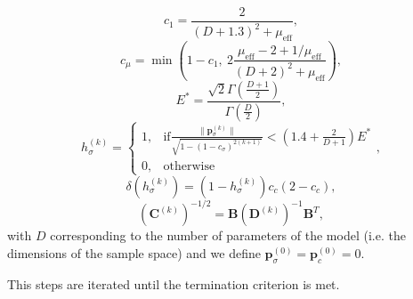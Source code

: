 \begin{equation}
c_1=\frac{2}{(D+1.3)^2+\mu_{\mathrm{eff}}},
\end{equation}
\begin{equation}
c_\mu=\min\left(1-c_1,\ 2\frac{\mu_{\mathrm{eff}}-2+1/\mu_{\mathrm{eff}}}{(D+2)^2+\mu_{\mathrm{eff}}}\right),
\end{equation}
\begin{equation}
E^*=\frac{\sqrt{2}\Gamma\left(\frac{D+1}{2}\right)}{\Gamma\left(\frac{D}{2}\right)},
\end{equation}
\begin{equation}h_\sigma^{(k)}=
\begin{cases} 
      1, & \mathrm{if} \frac{\|\mathbf{p}^{(k)}_\sigma\|}{\sqrt{1-\left(1-c_\sigma\right)^{2(k+1)}}}<\left(1.4+\frac{2}{D+1}\right)E^*\\
      0, & \mathrm{otherwise}
   \end{cases},
\end{equation}
\begin{equation}
\delta\left(h_\sigma^{(k)}\right)=\left(1-h_\sigma^{(k)}\right)c_c\left(2-c_c\right),
\end{equation}
\begin{equation}
\left(\mathbf{C}^{(k)}\right)^{-1/2}=\mathbf{B}\left(\mathbf{D}^{(k)}\right)^{-1}\mathbf{B}^T,
\end{equation}
\noindent with $D$ corresponding to the number of parameters of the model (i.e. the dimensions of the sample space) and we define $\mathbf{p}_\sigma^{(0)}=\mathbf{p}_c^{(0)}=0$.


This steps are iterated until the termination criterion is met.












